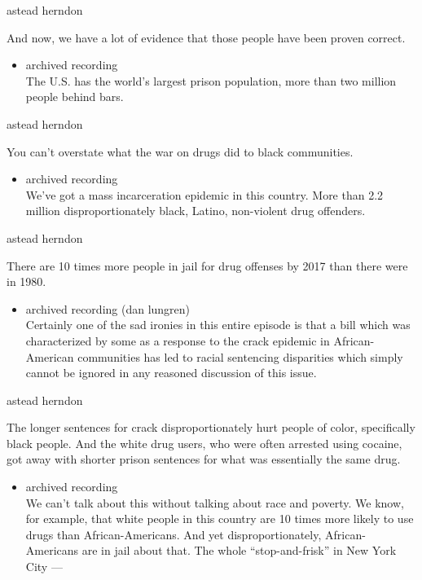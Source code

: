 astead herndon

And now, we have a lot of evidence that those people have been proven
correct.

\begin{itemize}
\tightlist
\item
  archived recording\\
  The U.S. has the world's largest prison population, more than two
  million people behind bars.
\end{itemize}

astead herndon

You can't overstate what the war on drugs did to black communities.

\begin{itemize}
\tightlist
\item
  archived recording\\
  We've got a mass incarceration epidemic in this country. More than 2.2
  million disproportionately black, Latino, non-violent drug offenders.
\end{itemize}

astead herndon

There are 10 times more people in jail for drug offenses by 2017 than
there were in 1980.

\begin{itemize}
\tightlist
\item
  archived recording (dan lungren)\\
  Certainly one of the sad ironies in this entire episode is that a bill
  which was characterized by some as a response to the crack epidemic in
  African-American communities has led to racial sentencing disparities
  which simply cannot be ignored in any reasoned discussion of this
  issue.
\end{itemize}

astead herndon

The longer sentences for crack disproportionately hurt people of color,
specifically black people. And the white drug users, who were often
arrested using cocaine, got away with shorter prison sentences for what
was essentially the same drug.

\begin{itemize}
\tightlist
\item
  archived recording\\
  We can't talk about this without talking about race and poverty. We
  know, for example, that white people in this country are 10 times more
  likely to use drugs than African-Americans. And yet
  disproportionately, African-Americans are in jail about that. The
  whole ``stop-and-frisk'' in New York City ---
\end{itemize}

